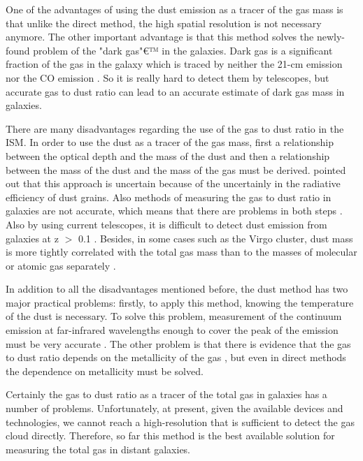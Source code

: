  One of the advantages of using the dust emission as a tracer of the gas mass is that unlike the direct method, the high spatial resolution is not necessary anymore. The other important advantage is that this method solves the newly-found problem of the "dark gas"€™ in the galaxies. Dark gas is a significant fraction of the gas in the galaxy which is traced by neither the 21-cm emission nor the CO emission \citep{Abdo10}. So it is really hard to detect them by telescopes, but accurate gas to dust ratio can lead to an accurate estimate of dark gas mass in galaxies. 

There are many disadvantages regarding the use of the gas to dust ratio in the ISM. In order to use the dust as a tracer of the gas mass, first a relationship between the optical depth and the mass of the dust and then a relationship between the mass of the dust and the mass of the gas must be derived. \cite{Draine03} pointed out that this approach is uncertain because of the uncertainly in the radiative efficiency of dust grains. Also methods of measuring the gas to dust ratio in galaxies are not accurate, which means that there are problems in both steps \citep{Hildebran83}. Also by using current telescopes, it is difficult to detect dust emission from galaxies at z $>$ 0.1 \citep{Ealas12}. Besides, in some cases such as the Virgo cluster, dust mass is more tightly correlated with the total gas mass than to the masses of molecular or atomic gas separately \citep{Corbelli11}. 

In addition to all the disadvantages mentioned before, the dust method has two major practical problems: firstly, to apply this method, knowing the temperature of the dust is necessary. To solve this problem, measurement of the continuum emission at far-infrared wavelengths enough to cover the peak of the emission must be very accurate \citep{Ealas12}. The other problem is that there is evidence that the gas to dust ratio depends on the metallicity of the gas \citep{Lisenfeld98, Draine07}, but even in direct methods the dependence on metallicity must be solved. 

Certainly the gas to dust ratio as a tracer of the total gas in galaxies has a number of problems. Unfortunately, at present, given the available devices and technologies, we cannot reach a high-resolution that is sufficient to detect the gas cloud directly. Therefore, so far this method is the best available solution for measuring the total gas in distant galaxies. 



